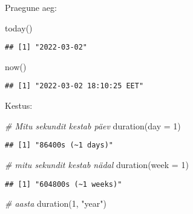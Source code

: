 \documentclass[
]{book}
\newenvironment{Shaded}{\begin{snugshade}}{\end{snugshade}}
\newcommand{\AttributeTok}[1]{\textcolor[rgb]{0.77,0.63,0.00}{#1}}
\newcommand{\CommentTok}[1]{\textcolor[rgb]{0.56,0.35,0.01}{\textit{#1}}}
\newcommand{\DecValTok}[1]{\textcolor[rgb]{0.00,0.00,0.81}{#1}}
\newcommand{\FunctionTok}[1]{\textcolor[rgb]{0.00,0.00,0.00}{#1}}
\newcommand{\NormalTok}[1]{#1}
\newcommand{\StringTok}[1]{\textcolor[rgb]{0.31,0.60,0.02}{#1}}
\begin{document}
Praegune aeg:

\begin{Shaded}
\begin{Highlighting}[]
\FunctionTok{today}\NormalTok{()}
\end{Highlighting}
\end{Shaded}

\begin{verbatim}
## [1] "2022-03-02"
\end{verbatim}

\begin{Shaded}
\begin{Highlighting}[]
\FunctionTok{now}\NormalTok{()}
\end{Highlighting}
\end{Shaded}

\begin{verbatim}
## [1] "2022-03-02 18:10:25 EET"
\end{verbatim}

Kestus:

\begin{Shaded}
\begin{Highlighting}[]
\CommentTok{\# Mitu sekundit kestab päev}
\FunctionTok{duration}\NormalTok{(}\AttributeTok{day =} \DecValTok{1}\NormalTok{)}
\end{Highlighting}
\end{Shaded}

\begin{verbatim}
## [1] "86400s (~1 days)"
\end{verbatim}

\begin{Shaded}
\begin{Highlighting}[]
\CommentTok{\# mitu sekundit kestab nädal}
\FunctionTok{duration}\NormalTok{(}\AttributeTok{week =} \DecValTok{1}\NormalTok{)}
\end{Highlighting}
\end{Shaded}

\begin{verbatim}
## [1] "604800s (~1 weeks)"
\end{verbatim}

\begin{Shaded}
\begin{Highlighting}[]
\CommentTok{\# aasta}
\FunctionTok{duration}\NormalTok{(}\DecValTok{1}\NormalTok{, }\StringTok{"year"}\NormalTok{)}
\end{Highlighting}
\end{Shaded}
\end{document}
